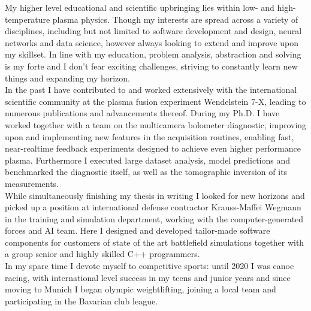 \documentclass[11pt,a4paper]{moderncv}
\begin{document}
%
My higher level educational and scientific upbringing lies within low- and high-temperature plasma physics. Though my interests are spread across a variety of disciplines, including but not limited to software development and design, neural networks and data science, however always looking to extend and improve upon my skillset. In line with my education, problem analysis, abstraction and solving is my forte and I don't fear exciting challenges, striving to constantly learn new things and expanding my horizon.\\[0.25cm]%
%
In the past I have contributed to and worked extensively with the international scientific community at the plasma fusion experiment Wendelstein 7-X, leading to numerous publications and advancements thereof.  During my Ph.D. I have worked together with a team on the multicamera bolometer diagnostic, improving upon and implementing new features in the acquisition routines, enabling fast, near-realtime feedback experiments designed to achieve even higher performance plasma. Furthermore I executed large dataset analysis, model predictions and benchmarked the diagnostic itself, as well as the tomographic inversion of its measurements.\\[0.25cm]%
%
While simultaneously finishing my thesis in writing I looked for new horizons and picked up a position at international defense contractor Krauss-Maffei Wegmann in the training and simulation department, working with the computer-generated forces and AI team. Here I designed and developed tailor-made software components for customers of state of the art battlefield simulations together with a group senior and highly skilled C++ programmers.\\[0.25cm]%
%
In my spare time I devote myself to competitive sports: until 2020 I was canoe racing, with international level success in my teens and junior years and since moving to Munich I began olympic weightlifting, joining a local team and participating in the Bavarian club league.\\[0.25cm]%
\end{document}
